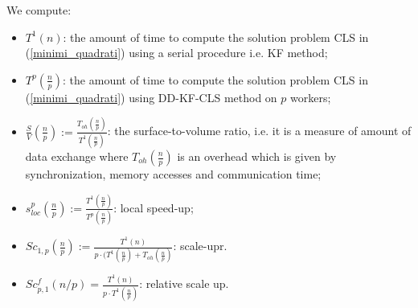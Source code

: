 \documentclass{report}
\begin{document}
We compute:
\begin{itemize}
\item $T^1(n)$: the amount of time to compute the solution problem CLS in (\ref{minimi_quadrati}) using a serial procedure i.e.  KF method;
\item $T^p(\frac{n}{p})$: the amount of time to compute the solution problem CLS in (\ref{minimi_quadrati}) using DD-KF-CLS method on $p$ workers;
\item $\frac{S}{V}(\frac{n}{p}):=\frac{T_{oh}(\frac{n}{p})}{T^1(\frac{n}{p})}$: the surface-to-volume ratio, i.e. it is a measure of amount of data exchange where $T_{oh}(\frac{n}{p})$ is an overhead which is given by synchronization, memory accesses and communication time;
\item  
$s_{loc}^{p}(\frac{n}{p}):=\frac{T^1(\frac{n}{p})}{T^p(\frac{n}{p})}$: local speed-up;
\item
$Sc_{1,p}(\frac{n}{p}):=\frac{T^1(n)}{p\cdot (T^{1}(\frac{n}{p})+T_{oh}(\frac{n}{p})}$: scale-upr.
\item $Sc_{p,1}^{f}(n/p)=\frac{T^{1}(n)}{p\cdot T^{1}(\frac{n}{p})}$: relative scale up.
\end{itemize}
\end{document}
